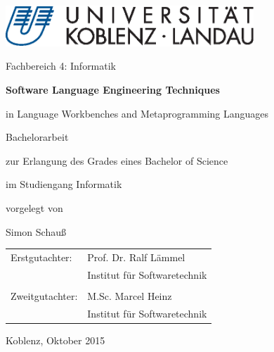 \begin{titlepage}
	\begin{center}
		\includegraphics[width=0.7\textwidth]{university-logo.eps}

		Fachbereich 4: Informatik

		\vspace*{4em}
		\Huge
		\textbf{Software Language Engineering Techniques}

		\vspace{0.5em}
		\LARGE
		in Language Workbenches and Metaprogramming Languages

		\vspace{2em}
		\Large
		Bachelorarbeit

		\vspace{0.5em}
		\normalsize
		zur Erlangung des Grades eines Bachelor of Science

		im Studiengang Informatik
	
		\vspace{1em}
		\small
		vorgelegt von

		\large
		Simon Schauß
	\end{center}

	\vspace{8em}
	\normalsize
	\noindent
	\begin{tabularx}{\textwidth}{@{} l l}
		Erstgutachter:  & Prof. Dr. Ralf Lämmel		\\
				& Institut für Softwaretechnik 	\\
				&				\\
		Zweitgutachter: & M.Sc. Marcel Heinz		\\
				& Institut für Softwaretechnik
	\end{tabularx}	

	\vspace{4em}
	\noindent
	Koblenz, Oktober 2015
\end{titlepage}
